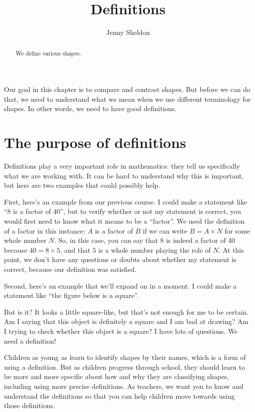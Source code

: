 \documentclass{ximera}
\title{Definitions}
\author{Jenny Sheldon}
\begin{document}
\begin{abstract}
We define various shapes.
\end{abstract}
\maketitle

Our goal in this chapter is to compare and contrast shapes. But before we can do that, we need to understand what we mean when we use different terminology for shapes. In other words, we need to have good definitions.

\section{The purpose of definitions}

Definitions play a very important role in mathematics: they tell us specifically what we are working with. It can be hard to understand why this is important, but here are two examples that could possibly help.

First, here's an example from our previous course. I could make a statement like ``$8$ is a factor of $40$'', but to verify whether or not my statement is correct, you would first need to know what it means to be a ``factor''. We used the definition of a factor in this instance: $A$ is a factor of $B$ if we can write $B = A \times N$ for some whole number $N$. So, in this case, you can say that $8$ is indeed a factor of $40$ because $40 = 8 \times 5$, and that $5$ is a whole number playing the role of $N$. At this point, we don't have any questions or doubts about whether my statement is correct, because our definition was satisfied.

Second, here's an example that we'll expand on in a moment. I could make a statement like ``the figure below is a square''.
\begin{center}
\end{center}
But is it? It looks a little square-like, but that's not enough for me to be certain. Am I saying that this object is definitely a square and I am bad at drawing? Am I trying to check whether this object is a square? I have lots of questions. We need a definition!

Children as young as  learn to identify shapes by their names, which is a form of using a definition. But as children progress through school, they should learn to be more and more specific about how and why they are classifying shapes, including using more precise definitions. As teachers, we want you to know and understand the definitions so that you can help children move towards using those definitions.
\end{document}
